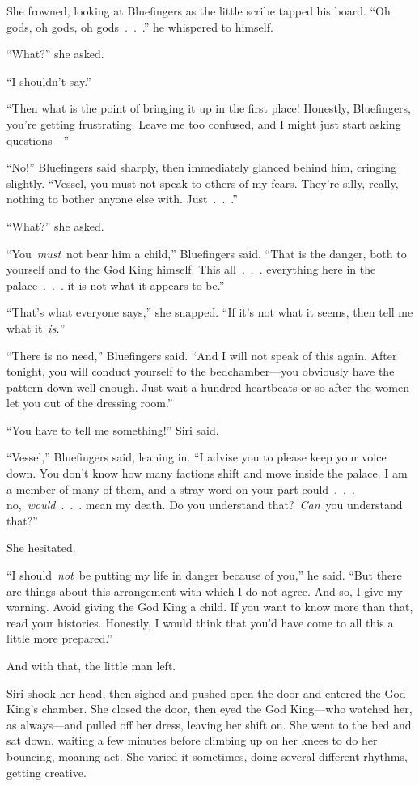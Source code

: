 She frowned, looking at Bluefingers as the little scribe tapped his board. “Oh gods, oh gods, oh gods~.~.~.” he whispered to himself.

“What?” she asked.

“I shouldn’t say.”

“Then what is the point of bringing it up in the first place! Honestly, Bluefingers, you’re getting frustrating. Leave me too confused, and I might just start asking questions—”

“No!” Bluefingers said sharply, then immediately glanced behind him, cringing slightly. “Vessel, you must not speak to others of my fears. They’re silly, really, nothing to bother anyone else with. Just~.~.~.”

“What?” she asked.

“You~\textit{must}~not bear him a child,” Bluefingers said. “That is the danger, both to yourself and to the God King himself. This all~.~.~. everything here in the palace~.~.~. it is not what it appears to be.”

“That’s what everyone says,” she snapped. “If it’s not what it seems, then tell me what it~\textit{is.}”

“There is no need,” Bluefingers said. “And I will not speak of this again. After tonight, you will conduct yourself to the bedchamber—you obviously have the pattern down well enough. Just wait a hundred heartbeats or so after the women let you out of the dressing room.”

“You have to tell me something!” Siri said.

“Vessel,” Bluefingers said, leaning in. “I advise you to please keep your voice down. You don’t know how many factions shift and move inside the palace. I am a member of many of them, and a stray word on your part could~.~.~. no,~\textit{would}~.~.~. mean my death. Do you understand that?~\textit{Can}~you understand that?”

She hesitated.

“I should~\textit{not}~be putting my life in danger because of you,” he said. “But there are things about this arrangement with which I do not agree. And so, I give my warning. Avoid giving the God King a child. If you want to know more than that, read your histories. Honestly, I would think that you’d have come to all this a little more prepared.”

And with that, the little man left.

Siri shook her head, then sighed and pushed open the door and entered the God King’s chamber. She closed the door, then eyed the God King—who watched her, as always—and pulled off her dress, leaving her shift on. She went to the bed and sat down, waiting a few minutes before climbing up on her knees to do her bouncing, moaning act. She varied it sometimes, doing several different rhythms, getting creative.

